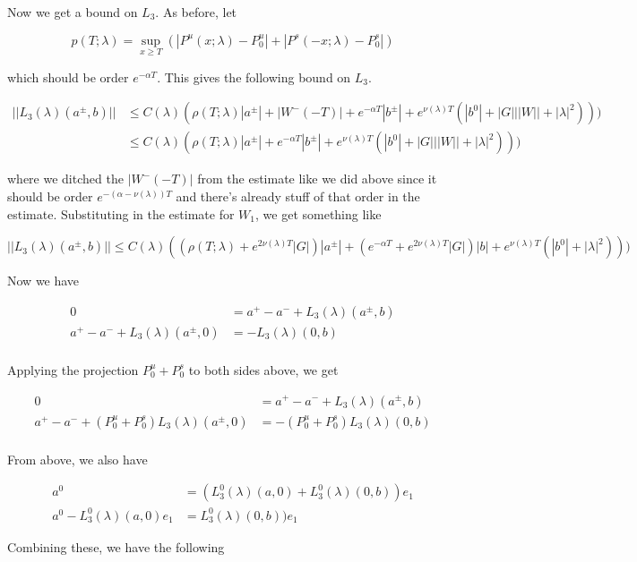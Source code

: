 \documentclass[12pt]{article}
\begin{document}
\begin{enumerate}
Now we get a bound on $L_3$. As before, let

\[
p(T;\lambda) = \sup_{x \geq T} (|P^u(x;\lambda) - P_0^u| + |P^s(-x;\lambda) - P_0^s|)
\]

which should be order $e^{-\alpha T}$. This gives the following bound on $L_3$.

\begin{align*}
||L_3(\lambda)(a^\pm,b)|| &\leq C(\lambda)(\rho(T; \lambda)|a^\pm| + |W^-(-T)| + e^{-\alpha T}|b^\pm| + e^{\nu(\lambda)T}( |b^0| + |G|||W|| + |\lambda|^2)) )\\
&\leq C(\lambda)(\rho(T; \lambda)|a^\pm| + e^{-\alpha T}|b^\pm| + e^{\nu(\lambda)T}( |b^0| + |G|||W|| + |\lambda|^2)) )
\end{align*}

where we ditched the $|W^-(-T)|$ from the estimate like we did above since it should be order $e^{-(\alpha - \nu(\lambda))T}$ and there's already stuff of that order in the estimate. Substituting in the estimate for $W_1$, we get something like

\[
||L_3(\lambda)(a^\pm, b)|| \leq C(\lambda)((\rho(T; \lambda) + e^{2 \nu(\lambda)T}|G|)|a^\pm| + (e^{-\alpha T}+ e^{2\nu(\lambda)T}|G|)|b| + e^{\nu(\lambda)T}( |b^0| + |\lambda|^2)) )
\]

Now we have

\begin{align*}
0 &= a^+ - a^- + L_3(\lambda)(a^\pm,b) \\
a^+ - a^- + L_3(\lambda)(a^\pm,0) &= - L_3(\lambda)(0,b) \\
\end{align*} 

Applying the projection $P^u_0 + P^s_0$ to both sides above, we get

\begin{align*}
0 &= a^+ - a^- + L_3(\lambda)(a^\pm,b) \\
a^+ - a^- + (P^u_0 + P^s_0) L_3(\lambda)(a^\pm,0) &= -(P^u_0 + P^s_0) L_3(\lambda)(0,b) \\
\end{align*} 

From above, we also have

\begin{align*}
a^0 &= ( L^0_3(\lambda)(a, 0) + L^0_3(\lambda)(0, b) ) e_1 \\
a^0 - L^0_3(\lambda)(a, 0) e_1 &= L^0_3(\lambda)(0, b) ) e_1
\end{align*}

Combining these, we have the following


\end{enumerate}
\end{document}
